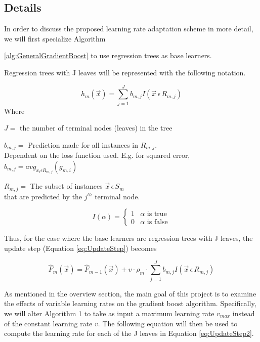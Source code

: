 \documentclass[runningheads]{llncs}
\begin{document}
\subsection{Details}
In order to discuss the proposed learning rate adaptation scheme in more detail, we will first specialize Algorithm {\ref{alg:GeneralGradientBoost} to use regression trees as base learners.

Regression trees with J leaves will be represented with the following notation.

\begin{equation}
h_m(\vec{x}) = \sum_{j=1}^{J}b_{m,j}I(\vec{x} \, \epsilon \, R_{m,j})
\end{equation}
Where 
\begin{center}
	\(J =\) the number of terminal nodes (leaves) in the tree 
\end{center}
\begin{center}
	\(b_{m,j} =\) Prediction made for all instances in \(R_{m,j}\).\\ 
	 Dependent on the loss function used. E.g. for squared error, \(b_{m,j} =  avg_{x_i \epsilon R_{m,j}}( g_{m, i}) \) 
\end{center}
\begin{center}
	\(R_{m,j} = \) The subset of instances \(\vec{x} \, \epsilon \, S_m\) \\
	that are predicted by the \(j^{th}\) terminal node.
\end{center}

\[ I(\alpha) = \begin{cases} 
1 & \alpha \text{ is true} \\
0 & \alpha \text{ is false}  
\end{cases}
\]

Thus, for the case where the base learners are regression trees with J leaves, the update step (Equation \ref{eq:UpdateStep}) becomes

		\begin{equation}
		\hat{F}_m(\vec{x}) = \hat{F}_{m-1}(\vec{x}) + v  \cdot  \rho_m  \cdot  \sum_{j=1}^{J}b_{m,j}I(\vec{x} \, \epsilon \, R_{m,j})
		\label{eq:UpdateStep2}
		\end{equation}

As mentioned in the overview section, the main goal of this project is to examine the effects of variable learning rates on the gradient boost algorithm. Specifically, we will alter Algorithm 1 to take as input a maximum learning rate \(v_{max}\) instead of the constant learning rate \(v\). The following equation will then be used to compute the learning rate for each of the J leaves in Equation \ref{eq:UpdateStep2}.

}
\end{document}
